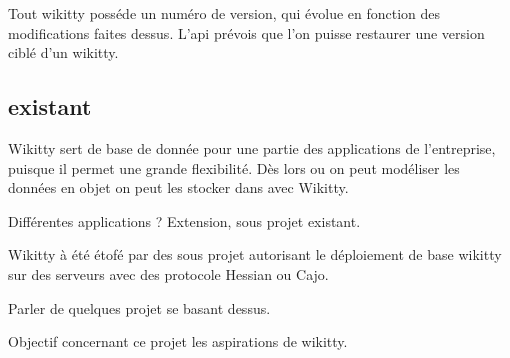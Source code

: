 Tout wikitty posséde un numéro de version, qui évolue en fonction des
modifications faites dessus. L'api prévois que l'on puisse restaurer une version
ciblé d'un wikitty.

\subsection{existant}

Wikitty sert de base de donnée pour une partie des applications de l'entreprise,
puisque il permet une grande flexibilité. Dès lors ou on peut modéliser les
données en objet on peut les stocker dans avec Wikitty.

Différentes applications ?
Extension, sous projet existant.

Wikitty à été étofé par des sous projet autorisant le déploiement de base
wikitty sur des serveurs avec des protocole Hessian ou Cajo.

Parler de quelques projet se basant dessus.

Objectif concernant ce projet les aspirations de wikitty.

